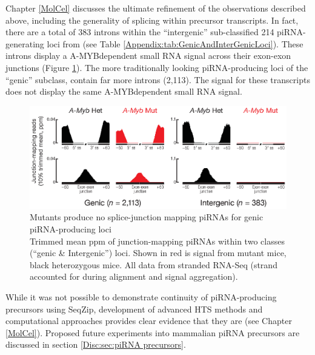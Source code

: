   Chapter \ref{MolCel} discusses the ultimate refinement of the observations described above, including the generality of splicing within precursor transcripts. In fact, there are a total of 383 introns within the ``intergenic'' sub-classified 214 piRNA-generating loci from \citep{Li2013e} (see Table \ref{Appendix:tab:GenicAndInterGenicLoci}). These introns display a A-MYB\textendash dependent small RNA signal across their exon-exon junctions (Figure \ref{SeqZipMethod:fig: amyb makes SJ mapping}). The more traditionally looking piRNA-producing loci of the ``genic'' subclass, contain far more introns (2,113). The signal for these transcripts does not display the same A-MYB\textendash dependent small RNA signal.

  \begin{figure} %
    \centering 
    \includegraphics{Figures/SeqZipMethod/aggregatePiRNAsatSpliceJunctions.eps}
    \caption[\amyb{} Mutants produce no splice-junction mapping piRNAs for genic piRNA-producing loci]
    {
      \amyb{} Mutants produce no splice-junction mapping piRNAs for genic piRNA-producing loci\\[0.25cm]
      Trimmed mean ppm of junction-mapping piRNAs within two classes (``genic \& Intergenic'') loci. Shown in red is signal from \amyb{} mutant mice, black \amyb{} heterozygous mice. All data from stranded RNA-Seq (strand accounted for during alignment and signal aggregation).
      }
    \label{SeqZipMethod:fig: amyb makes SJ mapping}
    \end{figure}

  While it was not possible to demonstrate continuity of piRNA-producing precursors using SeqZip, development of advanced HTS methods and computational approaches provides clear evidence that they are (see Chapter \ref{MolCel}). Proposed future experiments into mammalian piRNA precursors are discussed in section \ref{Disc:sec:piRNA precursors}.

\cleardoublepage
